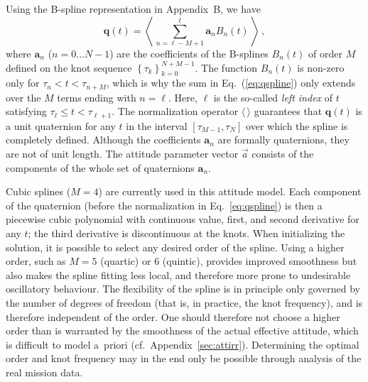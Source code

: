 \documentclass[structabstract]{aa}
\newcommand{\quat}[1]{\mathbf{#1}}
\begin{document}
Using the B-spline representation in Appendix~B, we have
\begin{equation}\label{eq:qspline}
\quat{q}(t) = \left\langle\, \textstyle\sum_{n=\ell-M+1}^{\ell}
\quat{a}_n B_n(t) \,\right\rangle \, ,
\end{equation}
where $\quat{a}_n$ ($n=0\dots N-1$) are the coefficients of the
B-splines $B_n(t)$ of order $M$ defined on the knot sequence
$\left\{\tau_k\right\}_{k=0}^{N+M-1}$. The function $B_n(t)$ is
non-zero only for $\tau_n < t < \tau_{n+M}$, which is why the
sum in Eq.~(\ref{eq:qspline}) only extends over the $M$ terms
ending with $n=\ell$. Here, $\ell$ is the so-called \emph{left index}
of $t$ satisfying $\tau_\ell \le t < \tau_{\ell+1}$. The normalization
operator $\langle\,\rangle$ guarantees that $\quat{q}(t)$ is a unit
quaternion for any $t$ in the interval $[\tau_{M-1},\tau_N]$ over which
the spline is completely defined. Although the coefficients
$\quat{a}_n$ are formally quaternions, they are not of unit length.
The attitude parameter vector $\vec{a}$ consists of the
components of the whole set of quaternions $\quat{a}_n$.

Cubic splines ($M=4$) are currently used in this attitude model.
Each component of the quaternion (before the normalization in
Eq.~\ref{eq:qspline}) is then a piecewise cubic polynomial
with continuous value, first, and second derivative for any $t$;
the third derivative is discontinuous at the knots.
When initializing the solution, it is possible
to select any desired order of the spline. Using a 
higher order, such as $M=5$ (quartic) or $6$ (quintic), provides
improved smoothness but also makes the spline fitting less local,
and therefore more prone to undesirable oscillatory behaviour.
The flexibility of the spline is in principle 
only governed by the number of degrees of freedom (that is, in 
practice, the knot frequency), and is therefore independent of the
order. One should therefore not choose a higher order than is
warranted by the smoothness of the actual effective attitude,
which is difficult to model a~priori (cf.\ Appendix~\ref{sec:attirr}). 
Determining the optimal order 
and knot frequency may in the end only be possible through
analysis of the real mission data. 
\end{document}
